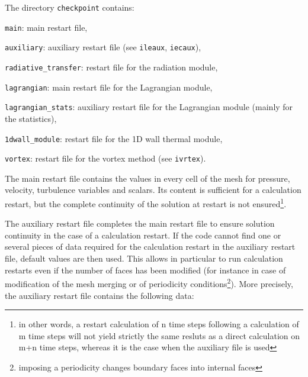 {{{The directory \texttt{checkpoint} contains:
\begin{list}{-}{}
\item \texttt{main}: main restart file,
\item \texttt{auxiliary}: auxiliary restart file (see \texttt{ileaux},
                       \texttt{iecaux}),
\item \texttt{radiative\_transfer}: restart file for the radiation module,
\item \texttt{lagrangian}: main restart file for the Lagrangian module,
\item \texttt{lagrangian\_stats}: auxiliary restart file for the Lagrangian module (mainly for the statistics),
\item \texttt{1dwall\_module}: restart file for the 1D wall thermal module,
\item \texttt{vortex}: restart file for the vortex method (see
                       \texttt{ivrtex}).
\end{list}

The main restart file contains the values in every cell of the mesh for
pressure, velocity, turbulence variables and scalars. Its content is sufficient
for a calculation restart, but the complete continuity of the solution at
restart is not ensured\footnote{in other words, a restart calculation of n time
steps following a calculation of m time steps will not yield strictly the same
resluts as a direct calculation on m+n time steps, whereas it is the case when
the auxiliary file is used}.

The auxiliary restart file completes the main restart file to ensure
solution continuity in the case of a calculation restart.
If the code cannot find one or several pieces of data required for the
calculation restart in the auxiliary restart file, default values are
then used. This allows in particular to run calculation restarts even if
the number of faces has been modified (for instance in case of
modification of the mesh merging or of periodicity
conditions\footnote{imposing a periodicity changes boundary faces into
internal faces}). More precisely, the auxiliary restart file contains
the following data:

}}}
